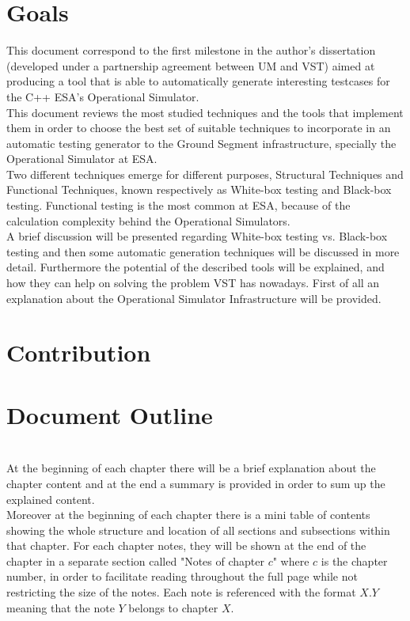\section{Goals}
This document correspond to the first milestone in the author's dissertation (developed under a partnership agreement between \ac{UM} and \ac{VST}) aimed at producing a tool
that is able to automatically generate interesting testcases for the C++ \ac{ESA}'s Operational Simulator.\\
This document reviews the most studied techniques
and the tools that implement them in order to choose the best set of
suitable techniques to incorporate in an automatic
testing generator to the Ground Segment infrastructure, specially the
Operational Simulator at \ac{ESA}.\\
Two different techniques emerge for different purposes, Structural
Techniques and Functional Techniques,
known respectively as White-box\cite{stt} testing and Black-box\cite{black} testing.
Functional testing is the most common at \ac{ESA}, because of the
calculation complexity behind the Operational Simulators.\\
A brief discussion will be presented regarding White-box testing vs. Black-box
testing and then some automatic generation techniques will be discussed in more detail.
Furthermore the potential of the described tools will be explained, and how they can help
on solving the problem \ac{VST} has nowadays. First of all an explanation about the Operational Simulator Infrastructure will be provided.

\section{Contribution}
\section{Document Outline}
\\
At the beginning of each chapter there will be a brief explanation about the chapter content and at
the end a summary is provided in order to sum up the explained content.\\

Moreover at the beginning of each chapter there is a mini table
of contents showing the whole structure and location of all sections and subsections within that chapter.
For each chapter notes, they will be shown at the end of the chapter in a separate section called "Notes of chapter $c$" where $c$ is the chapter number,
in order to facilitate reading throughout the full page while not restricting the size of the notes.
Each note is referenced with the format $X.Y$ meaning that
the note $Y$ belongs to chapter $X$.
\secendnote
